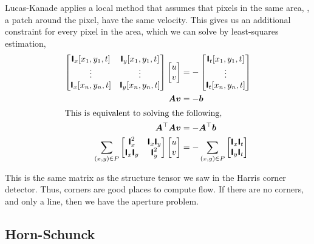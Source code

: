 Lucas-Kanade applies a local method that assumes that pixels in the same
area, \ie, a patch around the pixel, have the same velocity. This gives us an
additional constraint for every pixel in the area, which we can solve by
least-squares estimation,
\begin{align*}
  \begin{bmatrix}
    \bm{\mathsf{I}}_x[x_1,y_1,t] & \bm{\mathsf{I}}_y[x_1,y_1,t] \\
    \vdots & \vdots \\
    \bm{\mathsf{I}}_x[x_n,y_n,t] & \bm{\mathsf{I}}_y[x_n,y_n,t]
  \end{bmatrix}
  \begin{bmatrix}
    u \\ v
  \end{bmatrix}
  &=
  -\begin{bmatrix}
    \bm{\mathsf{I}}_t[x_1,y_1,t] \\
    \vdots \\
    \bm{\mathsf{I}}_t[x_n,y_n,t]
  \end{bmatrix} \\
  \bm{A}\bm{v} &= -\bm{b} \\
  \intertext{This is equivalent to solving the following,}
  \bm{A}^\top\bm{A}\bm{v} &= -\bm{A}^\top\bm{b} \\
  \sum_{(x,y)\in P}
  \begin{bmatrix}
    \bm{\mathsf{I}}_x^2 & \bm{\mathsf{I}}_x \bm{\mathsf{I}}_y \\
    \bm{\mathsf{I}}_x \bm{\mathsf{I}}_y & \bm{\mathsf{I}}_y^2
  \end{bmatrix}
  \begin{bmatrix}
    u \\ v
  \end{bmatrix}
  &=
  - \sum_{(x,y)\in P}
  \begin{bmatrix}
    \bm{\mathsf{I}}_x \bm{\mathsf{I}}_t \\
    \bm{\mathsf{I}}_y \bm{\mathsf{I}}_t \\
  \end{bmatrix}
\end{align*}

This is the same matrix as the structure tensor we saw in the Harris corner
detector. Thus, corners are good places to compute flow. If there are no
corners, and \eg only a line, then we have the aperture problem.

\subsection{Horn-Schunck}

